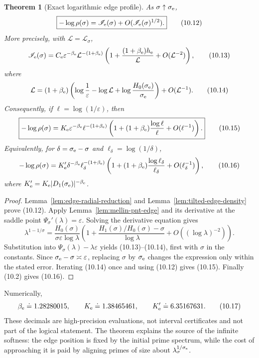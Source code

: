 \documentclass[11pt]{article}
\newtheorem{theorem}{Theorem}[section]
\theoremstyle{definition}
\theoremstyle{remark}
\newcommand{\eps}{\varepsilon}
\begin{document}
\begin{theorem}[Exact logarithmic edge profile]
\label{thm:exact-edge-profile}
As $\sigma\uparrow\sigma_{\rm e}$,
\[
 \boxed{-\log\rho(\sigma)
 =\mathscr I_{\rm e}(\sigma)+O(\mathscr I_{\rm e}(\sigma)^{1/2}).}
\tag{10.12}
\]
More precisely, with $\mathcal L=\mathcal L_\sigma$,
\[
 \mathscr I_{\rm e}(\sigma)
 =C_{\rm e}\eps^{-\beta_{\rm e}}\mathcal L^{-(1+\beta_{\rm e})}
 \left(1+\frac{(1+\beta_{\rm e})h_{\rm e}}{\mathcal L}
 +O(\mathcal L^{-2})\right),
\tag{10.13}
\]
where
\[
 \mathcal L=(1+\beta_{\rm e})\left(
 \log\frac1\eps-\log\mathcal L
 +\log\frac{H_0(\sigma_{\rm e})}{\sigma_{\rm e}}\right)
 +O(\mathcal L^{-1}).
\tag{10.14}
\]
Consequently, if $\ell=\log(1/\eps)$, then
\[
 \boxed{
 -\log\rho(\sigma)
 =K_{\rm e}\eps^{-\beta_{\rm e}}\ell^{-(1+\beta_{\rm e})}
 \left(1+(1+\beta_{\rm e})\frac{\log\ell}{\ell}
 +O(\ell^{-1})\right).}
\tag{10.15}
\]
Equivalently, for $\delta=\sigma_{\rm e}-\sigma$ and
$\ell_\delta=\log(1/\delta)$,
\[
 -\log\rho(\sigma)
 =K'_{\rm e}\delta^{-\beta_{\rm e}}
 \ell_\delta^{-(1+\beta_{\rm e})}
 \left(1+(1+\beta_{\rm e})\frac{\log\ell_\delta}{\ell_\delta}
 +O(\ell_\delta^{-1})\right),
\tag{10.16}
\]
where $K'_{\rm e}=K_{\rm e}|D_1(\sigma_{\rm e})|^{-\beta_{\rm e}}$.
\end{theorem}

\begin{proof}
Lemma~\ref{lem:edge-radial-reduction} and
Lemma~\ref{lem:tilted-edge-density} prove (10.12).  Apply
Lemma~\ref{lem:mellin-pnt-edge} and its derivative at the saddle point
$\Psi_\sigma'(\lambda)=\eps$.  Solving the derivative equation gives
\[
 \lambda^{1-1/\sigma}
 =\frac{H_0(\sigma)}{\sigma\eps\log\lambda}
 \left(1+\frac{H_1(\sigma)/H_0(\sigma)-\sigma}{\log\lambda}
 +O((\log\lambda)^{-2})\right).
\]
Substitution into $\Psi_\sigma(\lambda)-\lambda\eps$ yields (10.13)--(10.14),
first with $\sigma$ in the constants.  Since
$\sigma_{\rm e}-\sigma\asymp\eps$, replacing $\sigma$ by $\sigma_{\rm e}$
changes the expression only within the stated error.  Iterating (10.14) once
and using (10.12) gives (10.15).  Finally (10.2) gives (10.16).
\end{proof}

Numerically,
\[
 \beta_{\rm e}\doteq1.28280015,\qquad
 K_{\rm e}\doteq1.38465461,\qquad
 K'_{\rm e}\doteq6.35167631.
\tag{10.17}
\]
These decimals are high-precision evaluations, not interval certificates and not part
of the logical statement.  The theorem explains the source of the infinite softness:
the edge position is fixed by the initial prime spectrum, while the cost of approaching
it is paid by aligning primes of size about $\lambda_\sigma^{1/\sigma_{\rm e}}$.
\end{document}
